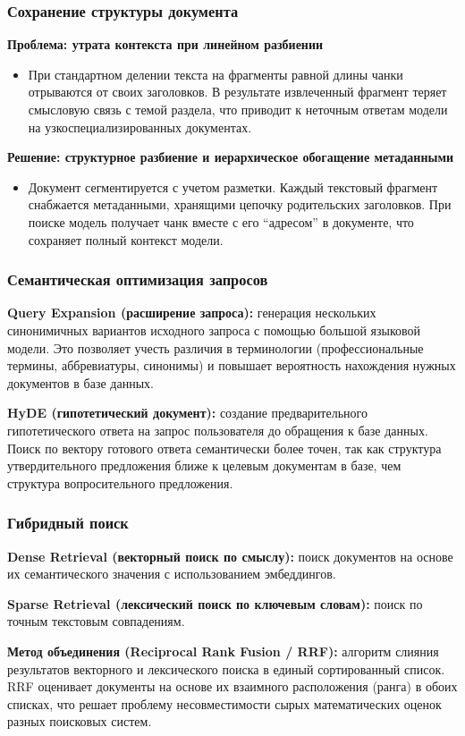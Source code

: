 \documentclass[aspectratio=169, xcolor={table}, usepdftitle=false]{beamer} %
\begin{document}
\begin{frame}
\frametitle{Сохранение структуры документа}
\textbf{Проблема: утрата контекста при линейном разбиении}
\begin{itemize}
    \item При стандартном делении текста на фрагменты равной длины чанки отрываются от своих заголовков. В результате извлеченный фрагмент теряет смысловую связь с темой раздела, что приводит к неточным ответам модели на узкоспециализированных документах.
\end{itemize}
\vspace{0.5cm}

\textbf{Решение: структурное разбиение и иерархическое обогащение метаданными}
\begin{itemize}
    \item Документ сегментируется с учетом разметки. Каждый текстовый фрагмент снабжается метаданными, хранящими цепочку родительских заголовков. При поиске модель получает чанк вместе с его ``адресом'' в документе, что сохраняет полный контекст модели.
\end{itemize}
\end{frame}

\begin{frame}
\frametitle{Семантическая оптимизация запросов}
\textbf{Query Expansion (расширение запроса):} генерация нескольких синонимичных вариантов исходного запроса с помощью большой языковой модели. Это позволяет учесть различия в терминологии (профессиональные термины, аббревиатуры, синонимы) и повышает вероятность нахождения нужных документов в базе данных.
\vspace{0.5cm}

\textbf{HyDE (гипотетический документ):} создание предварительного гипотетического ответа на запрос пользователя до обращения к базе данных. Поиск по вектору готового ответа семантически более точен, так как структура утвердительного предложения ближе к целевым документам в базе, чем структура вопросительного предложения.
\end{frame}

\begin{frame}
\frametitle{Гибридный поиск}
\textbf{Dense Retrieval (векторный поиск по смыслу):} поиск документов на основе их семантического значения с использованием эмбеддингов.
\vspace{0.4cm}

\textbf{Sparse Retrieval (лексический поиск по ключевым словам):} поиск по точным текстовым совпадениям.
\vspace{0.4cm}

\textbf{Метод объединения (Reciprocal Rank Fusion / RRF):} алгоритм слияния результатов векторного и лексического поиска в единый сортированный список. RRF оценивает документы на основе их взаимного расположения (ранга) в обоих списках, что решает проблему несовместимости сырых математических оценок разных поисковых систем.
\end{frame}
\end{document}
